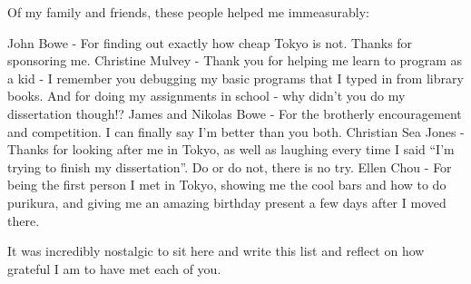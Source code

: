Of my family and friends, these people helped me immeasurably:

John Bowe - For finding out exactly how cheap Tokyo is not. Thanks for sponsoring me.
Christine Mulvey - Thank you for helping me learn to program as a kid - I remember you debugging my basic programs that I typed in from library books. And for doing my assignments in school - why didn’t you do my dissertation though!?
James and Nikolas Bowe - For the brotherly encouragement and competition. I can finally say I’m better than you both.
Christian Sea Jones - Thanks for looking after me in Tokyo, as well as laughing every time I said “I’m trying to finish my dissertation”. Do or do not, there is no try.
Ellen Chou - For being the first person I met in Tokyo, showing me the cool bars and how to do purikura, and giving me an amazing birthday present a few days after I moved there.

It was incredibly nostalgic to sit here and write this list and reflect on how grateful I am to have met each of you.

